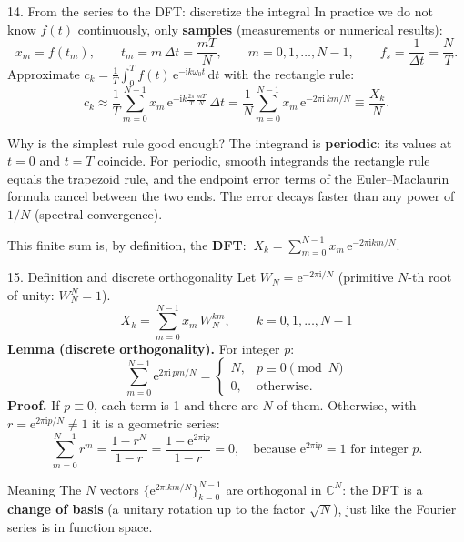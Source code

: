 \documentclass[aspectratio=169,10pt]{beamer}
\newcommand{\ii}{\mathrm{i}}
\newcommand{\ee}{\mathrm{e}}
\newcommand{\dd}{\,\mathrm{d}}
\begin{document}
\begin{frame}{14. From the series to the DFT: discretize the integral}
  \small
  In practice we do not know $f(t)$ continuously, only \textbf{samples} (measurements or numerical results):
  \[
    x_m=f(t_m),\qquad t_m=m\,\Delta t=\frac{mT}{N},\qquad m=0,1,\dots,N-1,\qquad f_s=\frac1{\Delta t}=\frac NT .
  \]
  Approximate $c_k=\frac1T\int_0^T f(t)\,\ee^{-\ii k\omega_0t}\dd t$ with the rectangle rule:
  \[
    c_k\approx\frac1T\sum_{m=0}^{N-1}x_m\,\ee^{-\ii k\frac{2\pi}{T}\frac{mT}{N}}\,\Delta t
    =\frac1N\sum_{m=0}^{N-1}x_m\,\ee^{-2\pi\ii\,km/N}\equiv\frac{X_k}{N}.
  \]
  \begin{keybox}{Why is the simplest rule good enough?}
    The integrand is \textbf{periodic}: its values at $t=0$ and $t=T$ coincide. For periodic, smooth integrands the rectangle rule equals the trapezoid rule, and the endpoint error terms of the Euler--Maclaurin formula cancel between the two ends. The error decays faster than any power of $1/N$ (spectral convergence).
  \end{keybox}
  This finite sum is, by definition, the \textbf{DFT}: $\ X_k=\sum_{m=0}^{N-1}x_m\,\ee^{-2\pi\ii km/N}$.
\end{frame}

\begin{frame}{15. Definition and discrete orthogonality}
  \footnotesize
  Let $W_N=\ee^{-2\pi\ii/N}$ (primitive $N$-th root of unity: $W_N^N=1$).
  \[
    \boxed{X_k=\sum_{m=0}^{N-1}x_m\,W_N^{km},\qquad k=0,1,\dots,N-1}
  \]
  \textbf{Lemma (discrete orthogonality).} For integer $p$:
  \[
    \sum_{m=0}^{N-1}\ee^{2\pi\ii\,pm/N}=\begin{cases}N,&p\equiv0\pmod N\\0,&\text{otherwise.}\end{cases}
  \]
  \textbf{Proof.} If $p\equiv0$, each term is 1 and there are $N$ of them. Otherwise, with $r=\ee^{2\pi\ii p/N}\neq1$ it is a geometric series:
  \[
    \sum_{m=0}^{N-1}r^m=\frac{1-r^N}{1-r}=\frac{1-\ee^{2\pi\ii p}}{1-r}=0,
    \quad\text{because }\ee^{2\pi\ii p}=1\text{ for integer }p.
  \]
  \begin{keybox}{Meaning}
    The $N$ vectors $\{\ee^{2\pi\ii km/N}\}_{k=0}^{N-1}$ are orthogonal in $\mathbb C^N$: the DFT is a \textbf{change of basis} (a unitary rotation up to the factor $\sqrt N$), just like the Fourier series is in function space.
  \end{keybox}
\end{frame}
\end{document}
